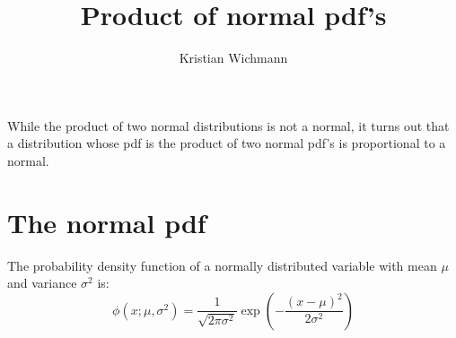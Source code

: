 \documentclass[12pt, a4paper]{article}
\title{Product of normal pdf's}
\author{Kristian Wichmann}
\begin{document}
\maketitle

While the product of two normal distributions is not a normal, it turns out that a distribution whose pdf is the product of two normal pdf's is proportional to a normal.

\section{The normal pdf}
The probability density function of a normally distributed variable with mean $\mu$ and variance $\sigma^2$ is:
\begin{equation}
\phi(x;\mu,\sigma^2)=\frac{1}{\sqrt{2\pi\sigma^2}}\exp\left(-\frac{(x-\mu)^2}{2\sigma^2}\right)
\end{equation}
\end{document}
